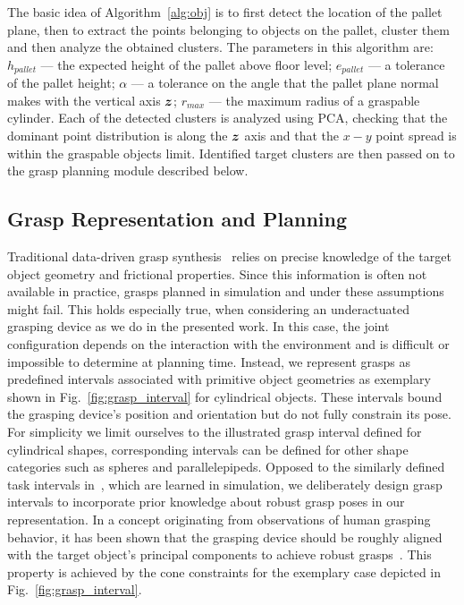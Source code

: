 The basic idea of Algorithm~\ref{alg:obj} is to first detect the location of the pallet plane, then
to extract the points belonging to objects on the pallet, cluster them and then analyze the obtained
clusters. The parameters in this algorithm are:
$h_{pallet}$ --- the expected height of the pallet above floor level; $e_{pallet}$ --- a tolerance
of the pallet height; $\alpha$ --- a tolerance on the angle that the pallet plane normal makes with
the vertical axis $\mbox{\boldmath $z$}$; $r_{max}$ --- the maximum radius of a graspable cylinder. Each of the
detected clusters is analyzed using PCA, checking that the dominant point distribution is along the
$\mbox{\boldmath $z$}$ axis and that the $x-y$ point spread is within the graspable objects limit. Identified
target clusters are then passed on to the grasp planning module described below.
%
\subsection{Grasp Representation and Planning}
\label{subsec:grasp_planning}
%
Traditional data-driven grasp synthesis~\cite{Bohg14} relies on precise knowledge of the target
object geometry and frictional properties. Since this information is often not available in
practice, grasps planned in simulation and under these assumptions might fail. This holds especially
true, when considering an underactuated grasping device as we do in the presented work. In this
case, the joint configuration depends on the interaction with the environment and is difficult or
impossible to determine at planning time. Instead, we represent grasps as predefined intervals
associated with primitive object geometries as exemplary shown in Fig.~\ref{fig:grasp_interval} for
cylindrical objects. These intervals bound the grasping device's position and orientation but do not
fully constrain its pose. For simplicity we limit ourselves to the illustrated grasp interval
defined for cylindrical shapes, corresponding intervals can be defined for other shape categories
such as spheres and parallelepipeds. Opposed to the similarly defined task intervals
in~\cite{Gien08a, Gien08b}, which are learned in simulation, we deliberately design grasp intervals
to incorporate prior knowledge about robust grasp poses in our representation. In a concept
originating from observations of human grasping behavior, it has been shown that the grasping device
should be roughly aligned with the target object's principal components to achieve robust
grasps~\cite{Bala12}. This property is achieved by the cone constraints for the exemplary case
depicted in Fig.~\ref{fig:grasp_interval}.

